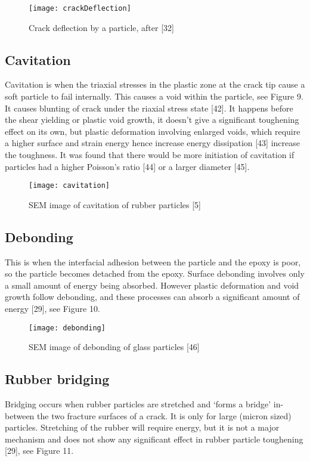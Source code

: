 \documentclass[numbers=noendperiod,chapterprefix=on]{icldt} %
\begin{document}
\begin{figure}[!htpb]
\centering
\texttt{[image: crackDeflection]}
\caption{Crack deflection by a particle, after [32]} %
\end{figure}

\subsection{Cavitation} 
Cavitation is when the triaxial stresses in the plastic zone at the crack tip cause a soft particle to fail internally. This causes a void within the particle, see Figure 9. It causes blunting of crack under the riaxial stress state [42]. It happens before the shear yielding or plastic void growth, it doesn’t give a significant toughening effect on its own, but plastic deformation involving enlarged voids, which require a higher surface and strain energy hence increase energy dissipation [43] increase the toughness. It was found that there would be more initiation of cavitation if particles had a higher Poisson’s ratio [44] or a larger diameter [45].

\begin{figure}[!htpb]
\centering
\texttt{[image: cavitation]}
\caption{SEM image of cavitation of rubber particles [5] } %
\end{figure}

\subsection{Debonding}
This is when the interfacial adhesion between the particle and the epoxy is poor, so the particle becomes detached from the epoxy. Surface debonding involves only a small amount of energy being absorbed. However plastic deformation and void growth follow debonding, and these processes can absorb a significant amount of energy [29], see Figure 10. 

\begin{figure}[!hp]
\centering
\texttt{[image: debonding]}
\caption{SEM image of debonding of glass particles [46]} %
\end{figure}

\subsection{Rubber bridging}
Bridging occurs when rubber particles are stretched and ‘forms a bridge’ in-between the two fracture surfaces of a crack. It is only for large (micron sized) particles. Stretching of the rubber will require energy, but it is not a major mechanism and does not show any significant effect in rubber particle toughening [29], see Figure 11. 
\end{document}
